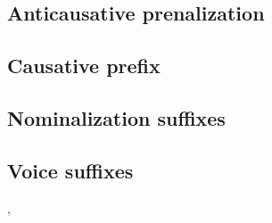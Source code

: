 \documentclass[oneside,a4paper,11pt]{article}
\begin{document}
\subsection{Anticausative prenalization}
\citet{sagart03prenasalized}
\citet{jacques15spontaneous, jacques15causative}

\subsection{Causative prefix}
\citet{sagart12sprefix}
\citet{jacques15causative}

\subsection{Nominalization suffixes}
\citet{jacques16ssuffixes}

\subsection{Voice suffixes}
\citet{jacques16ssuffixes}, \citet{jacques16si}




\end{document}

